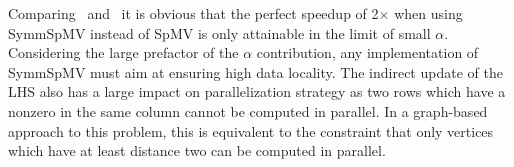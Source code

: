 Comparing~ and~ it is obvious that the perfect speedup of 2$\times$ when using \acrshort{SymmSpMV} instead of \acrshort{SpMV} is only attainable in the limit of small $\alpha$\@. %
Considering the large prefactor of the $\alpha$ contribution, any implementation of \acrshort{SymmSpMV} must aim at ensuring high data locality. The indirect update of the LHS also has a large impact on parallelization strategy as two rows which have a nonzero in the same column cannot be computed in parallel. In a graph-based approach to this problem, this is equivalent to the constraint that only vertices which have at least distance two can be computed in parallel.

\begin{comment}
\subsubsection{\GS and \SYMMGS}
Gauss-Seidel (\GS) is a solver having \DONE dependency. Contrary to the above kernels \GS is in-exact meaning it is an iterative method. \Cref{alg:GS} shows the Gauss-Seidel algorithm where its assumed that the diagonal entries of the matrix are stored as first entry in their corresponding rows.
\begin{algorithm}[H]
	\caption{GS Solve for $x$ : $Ax=b$} 
	\label{alg:GS}
	\begin{algorithmic}[1]
		\FOR{$row=1:nrows$}
		\STATE{$x[row]+=b[row]$}
		\FOR{$idx=rowPtr[row]+1:rowPtr[row+1]$}
		\STATE{$x[row] -= A[idx]*x[col[idx]]$} 
		\ENDFOR
		\STATE{$diag=A[rowPtr[row]]$}
		\STATE{$x[row]/=diag$}
		\ENDFOR
	\end{algorithmic}
\end{algorithm}
Regarding the in-core execution the kernel has same properties as of \acrshort{SpMV}, but requires an additional divide operation per row of the matrix. If the locality ($\alpha$ factor) is not disturbed due to pre-processing the kernel requires same data traffic as of \acrshort{SpMV}. The arithmetic intensity of \GS is the same as that of \acrshort{SpMV}, if we neglect the divide operation that occurs once per every row.
\begin{equation}
\label{eq:GS_intensity}
I_\mathrm{GS} = I_\mathrm{SPMV}
\end{equation}



In general for most of the algorithms one is interested in symmetric operator therefore commonly one would encounter symmetric variant of Gauss-Seidel, so called symmetric Gauss-Seidel (\SYMMGS). The algorithm remains same except that instead of just doing forward sweep shown in \Cref{alg:GS} one would follow it with a backward sweep \ie {\tt row=nrows:-1:1}. The intensity of \SYMMGS remains same as of \GS, as we do two times more flops and bring in proportional data.
\end{comment}

